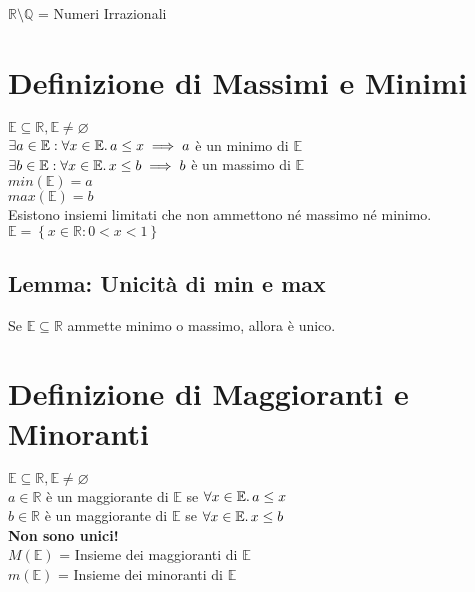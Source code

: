 \documentclass[a4paper, twoside, italian, 11pt]{book}
\newcommand{\braces}[1] {\left\{#1\right\}}
\newcommand{\Q}{\mathbb{Q}}
\newcommand{\R}{\mathbb{R}}
\newcommand{\E}{\mathbb{E}}
\let\emptyset\varnothing
\begin{document}
\noindent
$\R \setminus \Q$ = Numeri Irrazionali



\section{Definizione di Massimi e Minimi}

$\E \subseteq \R, \E \neq \emptyset$ \\

$\exists a \in \E : \forall x \in \E \ldotp a \leq x \implies a$ è un minimo di $\E$ \\

$\exists b \in \E : \forall x \in \E \ldotp x \leq b \implies b$ è un massimo di $\E$ \\

$min(\E) = a$ \\
\indent
$max(\E) = b$ \\

\noindent
Esistono insiemi limitati che non ammettono né massimo né minimo. \\

$\E = \braces{x \in \R : 0 < x < 1}$


\subsection{Lemma: Unicità di min e max}

Se $\E \subseteq \R$ ammette minimo o massimo, allora è unico.




\section{Definizione di Maggioranti e Minoranti}

$\E \subseteq \R, \E \neq \emptyset$ \\

$a \in \R$ è un maggiorante di $\E$ se $\forall x \in \E \ldotp a \leq x$ \\

$b \in \R$ è un maggiorante di $\E$ se $\forall x \in \E \ldotp x \leq b$ \\

\noindent
\textbf{Non sono unici!} \\

\noindent
$M(\E)$ = Insieme dei maggioranti di $\E$\\
$m(\E)$ = Insieme dei minoranti di $\E$
\end{document}
